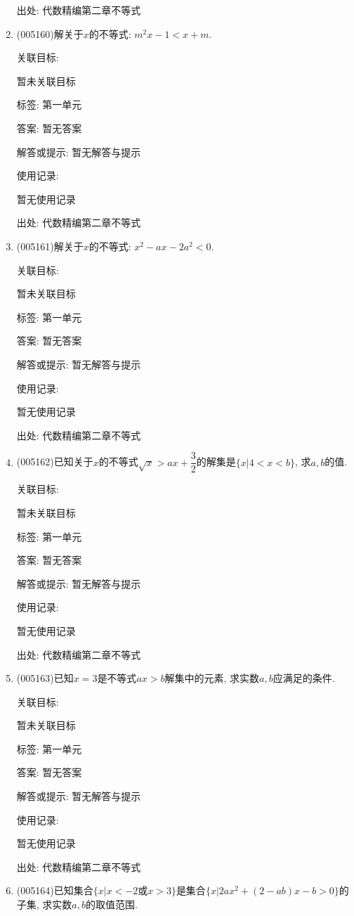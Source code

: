 \documentclass[10pt,a4paper]{article}
\begin{document}
\begin{enumerate}[1.]
出处: 代数精编第二章不等式
\item { (005160)}解关于$x$的不等式: $m^2x-1<x+m$.


关联目标:

暂未关联目标



标签: 第一单元

答案: 暂无答案

解答或提示: 暂无解答与提示

使用记录:

暂无使用记录


出处: 代数精编第二章不等式
\item { (005161)}解关于$x$的不等式: $x^2-ax-2a^2<0$.


关联目标:

暂未关联目标



标签: 第一单元

答案: 暂无答案

解答或提示: 暂无解答与提示

使用记录:

暂无使用记录


出处: 代数精编第二章不等式
\item { (005162)}已知关于$x$的不等式$\sqrt x>ax+\dfrac 32$的解集是$\{x|4<x<b\}$, 求$a,b$的值.


关联目标:

暂未关联目标



标签: 第一单元

答案: 暂无答案

解答或提示: 暂无解答与提示

使用记录:

暂无使用记录


出处: 代数精编第二章不等式
\item { (005163)}已知$x=3$是不等式$ax>b$解集中的元素, 求实数$a,b$应满足的条件.


关联目标:

暂未关联目标



标签: 第一单元

答案: 暂无答案

解答或提示: 暂无解答与提示

使用记录:

暂无使用记录


出处: 代数精编第二章不等式
\item { (005164)}已知集合$\{x|x<-2\text{或}x>3\}$是集合$\{x|2ax^2+(2-ab)x-b>0\}$的子集, 求实数$a,b$的取值范围.



\end{enumerate}
\end{document}

